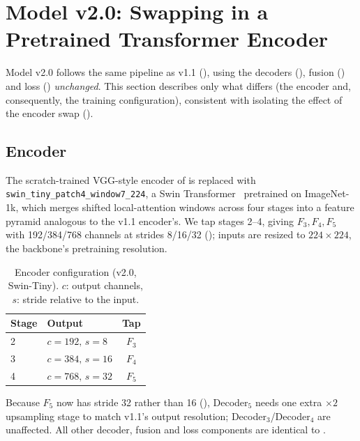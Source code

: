 
\section{Model v2.0: Swapping in a Pretrained Transformer Encoder}
\label{sec:model20}

Model v2.0 follows the same pipeline as v1.1 (), using the decoders (), fusion () and loss () \textit{unchanged}. This section describes only what differs (the encoder and, consequently, the training configuration), consistent with isolating the effect of the encoder swap ().

\subsection{Encoder}
\label{subsec:encoder20}

The scratch-trained VGG-style encoder of  is replaced with \texttt{swin\_tiny\_patch4\_window7\_224}, a Swin Transformer~\cite{liu2021swin} pretrained on ImageNet-1k, which merges shifted local-attention windows across four stages into a feature pyramid analogous to the v1.1 encoder's. We tap stages 2--4, giving $F_3, F_4, F_5$ with 192/384/768 channels at strides 8/16/32 (); inputs are resized to $224\times224$, the backbone's pretraining resolution.

\begin{table}[t]
\centering
\caption{Encoder configuration (v2.0, Swin-Tiny). $c$: output channels, $s$: stride relative to the input.}
\label{tab:encoder20}
\begin{tabular}{@{}llc@{}}
\toprule
\textbf{Stage} & \textbf{Output} & \textbf{Tap} \\
\midrule
2 & $c{=}192,\,s{=}8$  & $F_3$ \\
3 & $c{=}384,\,s{=}16$ & $F_4$ \\
4 & $c{=}768,\,s{=}32$ & $F_5$ \\
\bottomrule
\end{tabular}
\end{table}

Because $F_5$ now has stride 32 rather than 16 (), Decoder$_5$ needs one extra $\times2$ upsampling stage to match v1.1's output resolution; Decoder$_3$/Decoder$_4$ are unaffected. All other decoder, fusion and loss components are identical to .

